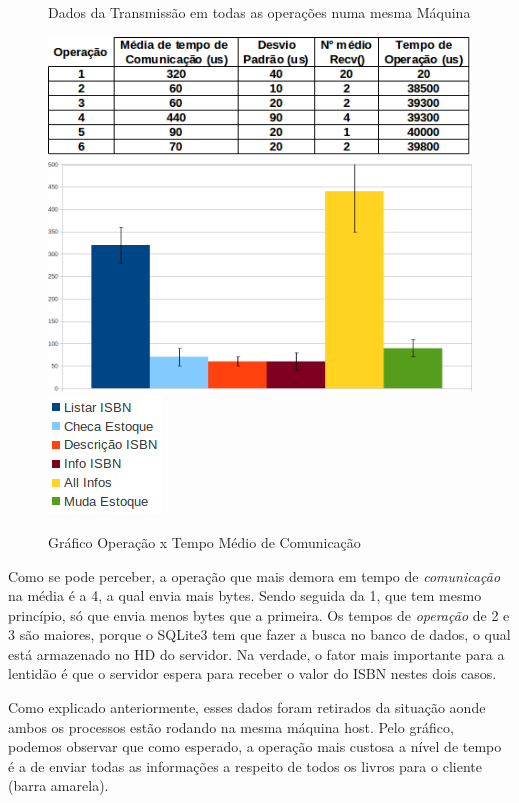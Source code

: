\documentclass[10pt,a4paper]{report}
\begin{document}
\begin{figure}[h!]
\caption{Dados da Transmissão em todas as operações numa mesma Máquina}
\includegraphics[width=\textwidth]{Imagens/t01.png}
\includegraphics[width=\textwidth]{Imagens/g01.png}
\includegraphics{Imagens/g011.png}
\caption{Gráfico Operação x Tempo Médio de Comunicação}
\end{figure}

Como se pode perceber, a operação que mais demora em tempo de \textit{comunicação} na média é a 4, a qual envia mais bytes. Sendo seguida da 1, que tem mesmo princípio, só que envia menos bytes que a primeira.
Os tempos de \textit{operação} de 2 e 3 são maiores, porque o SQLite3 tem que fazer a busca no banco de dados, o qual está armazenado no HD do servidor. Na verdade, o fator mais importante para a lentidão é que o servidor espera para receber o valor do ISBN nestes dois casos.

Como explicado anteriormente, esses dados foram retirados da situação aonde ambos os processos estão rodando na mesma máquina host. Pelo gráfico, podemos observar que como esperado, a operação mais custosa a nível de tempo é a de enviar todas as informações a respeito de todos os livros para o cliente (barra amarela).
\end{document}
